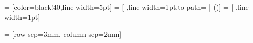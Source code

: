 %

 = [color=black!40,line width=5pt]
 = [-,line width=1pt,to path={-| (\tikztotarget)}]
 = [-,line width=1pt]


 = [row sep=3mm, column sep=2mm]


\newcommand{\MultilineComponent}[3]
{
	\begin{minipage}{#1}
	\begin{center}
		#2 \linebreak #3
	\end{center}
	\end{minipage}
}

\newcommand{\MultiColumnComponent}[5]
{
	\begin{minipage}{#1}
	\begin{center}
	#2 \linebreak #3
	\end{center}
	\begin{minipage}{0.49\textwidth}
	\begin{center}
	#4
	\end{center}
	\end{minipage}
	\begin{minipage}{0.49\textwidth}
	\begin{center}
	#5
	\end{center}
	\end{minipage}
	\end{minipage}
}

